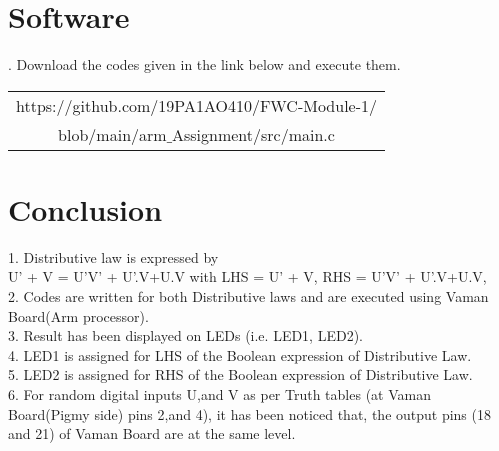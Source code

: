 \documentclass[10pt, a4paper]{article}
\begin{document}
\section{Software}
. Download the codes given in the link below and execute them.\\
\begin{table}[h]
\centering
\begin{tabular}{| c |} \hline
 \rule{0pt}{20pt} https://github.com/19PA1AO410/FWC-Module-1/
 \\blob/main/arm$\_$Assignment/src/main.c \\\hline
\end{tabular}
\end{table}
\section{Conclusion}
\begin{flushleft}
1. Distributive law is expressed by \\
\vspace{0.25cm}
U’ + V = U’V’ + U’.V+U.V with LHS = U’ + V, RHS = U’V’ + U’.V+U.V,\\
\vspace{0.25cm}
2. Codes are written for both Distributive laws and are executed using Vaman Board(Arm processor).
\vspace{0.2cm}\\
3. Result has been displayed on LEDs (i.e. LED1, LED2).
\vspace{0.2cm}\\
4. LED1 is assigned for LHS of the Boolean expression of Distributive Law.
\vspace{0.2cm}\\
5. LED2 is assigned for RHS of the Boolean expression of Distributive Law.
\vspace{0.2cm}\\
6. For random digital inputs U,and V as per Truth tables (at Vaman Board(Pigmy side)  pins 2,and 4), it has been noticed that, the output pins (18 and 21) of Vaman Board are at the same level.
\end{flushleft}
\end{document}
